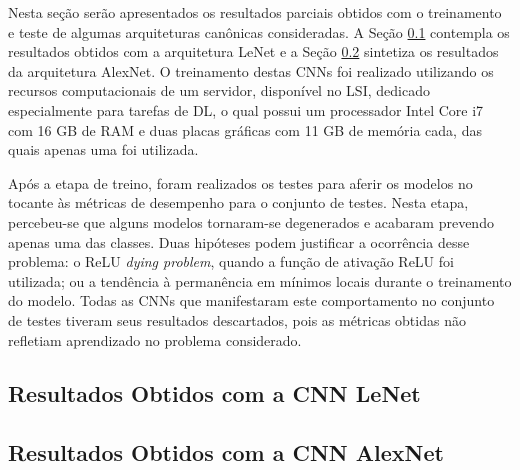 
Nesta seção serão apresentados os resultados parciais obtidos com o treinamento e teste de algumas arquiteturas canônicas consideradas. A Seção \ref{sec:lenet}  contempla os resultados obtidos com a arquitetura LeNet e a Seção  \ref{sec:alexnet} sintetiza os resultados da arquitetura AlexNet. O treinamento destas CNNs foi realizado utilizando os recursos computacionais de um servidor, disponível no LSI, dedicado especialmente para tarefas de DL, o qual possui um processador Intel Core i7 com 16 GB de RAM e duas placas gráficas com 11 GB de memória cada, das quais apenas uma foi utilizada.

Após a etapa de treino, foram realizados os testes para aferir os modelos no tocante às métricas de desempenho para o conjunto de testes. Nesta etapa, percebeu-se que alguns modelos tornaram-se degenerados e acabaram prevendo apenas uma das classes. Duas hipóteses podem justificar a ocorrência desse problema: o ReLU \emph{dying problem}, quando a função de ativação ReLU foi utilizada; ou a tendência à permanência em mínimos locais durante o treinamento do modelo. Todas as CNNs que manifestaram este comportamento no conjunto de testes tiveram seus resultados descartados, pois as métricas obtidas não refletiam aprendizado no problema considerado.


\subsection{Resultados Obtidos com a CNN LeNet}
\label{sec:lenet}


\subsection{Resultados Obtidos com a CNN AlexNet}
\label{sec:alexnet}

